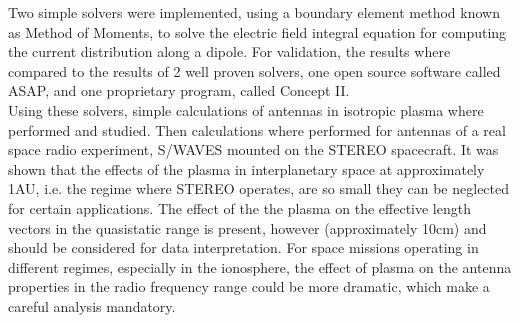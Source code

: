 \documentclass[two-coloumn,ras]{agutex}
\begin{document}
\begin{article}
Two simple solvers were implemented, using a boundary element method known as Method of Moments, to solve the electric field integral equation for computing the current distribution along a dipole. For validation, the results where compared to the results of 2 well proven solvers, one open source software called ASAP, and one proprietary program, called Concept II.\\

Using these solvers, simple calculations of antennas in isotropic plasma where performed and studied. Then calculations where performed for antennas of a real space radio experiment, S/WAVES mounted on the STEREO spacecraft. It was shown that the effects of the plasma in interplanetary space at approximately 1AU, i.e. the regime where STEREO operates, are so small they can be neglected for certain applications. The effect of the the plasma on the effective length vectors in the quasistatic range is present, however (approximately 10cm) and should be considered for data interpretation. For space missions operating in different regimes, especially in the ionosphere, the effect of plasma on the antenna properties in the radio frequency range could be more dramatic, which make a careful analysis mandatory.\\


%
%





\end{article}
\end{document}
